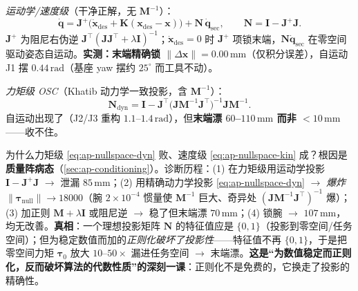 \emph{运动学/速度级}（干净正解，无 $\mathbf{M}^{-1}$）：
\begin{equation}
  \dot{\mathbf{q}}=\mathbf{J}^{+}\big(\dot{\mathbf{x}}_{\mathrm{des}}+\mathbf{K}(\mathbf{x}_{\mathrm{des}}-\mathbf{x})\big)+\mathbf{N}\,\dot{\mathbf{q}}_{\mathrm{sec}},\qquad
  \mathbf{N}=\mathbf{I}-\mathbf{J}^{+}\mathbf{J}.
  \label{eq:ap-nullspace-kin}
\end{equation}
$\mathbf{J}^{+}$ 为阻尼右伪逆 $\mathbf{J}^\top(\mathbf{J}\mathbf{J}^\top+\lambda\mathbf{I})^{-1}$；$\dot{\mathbf{x}}_{\mathrm{des}}=0$ 时 $\mathbf{J}^{+}$ 项锁末端，$\mathbf{N}\dot{\mathbf{q}}_{\mathrm{sec}}$ 在零空间驱动姿态自运动。\textbf{实测：末端精确锁 $\|\Delta\mathbf{x}\|=0.00\,\mathrm{mm}$}（仅积分误差），自运动 J1 摆 $0.44\,\mathrm{rad}$（基座 yaw 摆约 $25^\circ$ 而工具不动）。

\emph{力矩级 OSC}（Khatib 动力学一致投影，含 $\mathbf{M}^{-1}$）：
\begin{equation}
  \mathbf{N}_{\mathrm{dyn}}=\mathbf{I}-\mathbf{J}^\top\big(\mathbf{J}\mathbf{M}^{-1}\mathbf{J}^\top\big)^{-1}\mathbf{J}\mathbf{M}^{-1}.
  \label{eq:ap-nullspace-dyn}
\end{equation}
自运动出现了（J2/J3 重构 $1.1$--$1.4\,\mathrm{rad}$），但\textbf{末端漂 $60$--$110\,\mathrm{mm}$ 而非 $<10\,\mathrm{mm}$}——收不住。

\begin{insight}\label{ins:ap-osc-breakdown}
为什么力矩级 \cref{eq:ap-nullspace-dyn} 败、速度级 \cref{eq:ap-nullspace-kin} 成？根因是\textbf{质量阵病态}（\cref{sec:ap-conditioning}）。诊断历程：(1) 在力矩级用运动学投影 $\mathbf{I}-\mathbf{J}^{+}\mathbf{J}$ $\to$ 泄漏 $85\,\mathrm{mm}$；(2) 用精确动力学投影 \cref{eq:ap-nullspace-dyn} $\to$ \emph{爆炸} $\|\boldsymbol{\tau}_{\mathrm{null}}\|\to 18000$（腕 $2\times10^{-4}$ 惯量使 $\mathbf{M}^{-1}$ 巨大、奇异处 $(\mathbf{J}\mathbf{M}^{-1}\mathbf{J}^\top)^{-1}$ 爆）；(3) 加正则 $\mathbf{M}+\lambda\mathbf{I}$ 或阻尼逆 $\to$ 稳了但末端漂 $70\,\mathrm{mm}$；(4) 锁腕 $\to$ $107\,\mathrm{mm}$，均无改善。\textbf{真相}：一个理想投影矩阵 $\mathbf{N}$ 的特征值应是 $\{0,1\}$（投影到零空间/任务空间）；但为稳定数值而加的\emph{正则化破坏了投影性}——特征值不再 $\{0,1\}$，于是把零空间力矩 $\boldsymbol{\tau}_0$ 放大 $10$--$50\times$ 漏进任务空间 $\to$ 末端漂。\textbf{这是“为数值稳定而正则化，反而破坏算法的代数性质”的深刻一课}：正则化不是免费的，它换走了投影的精确性。
\end{insight}

